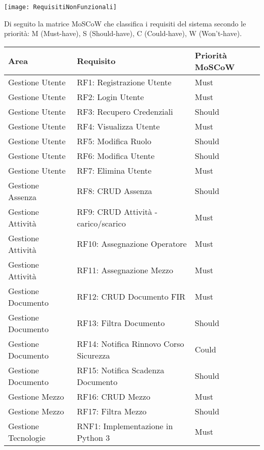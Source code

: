 \documentclass[a4paper]{report}
\begin{document}
\begin{figure*}[ht]
    \centering
    \texttt{[image: RequisitiNonFunzionali]}
\end{figure*}


\clearpage
{}

Di seguito la matrice MoSCoW che classifica i requisiti del sistema secondo le priorità: M (Must-have), S (Should-have), C (Could-have), W (Won't-have).

\begin{longtable}{|p{4.5cm}|p{6.25cm}|p{2cm}|}
\hline
	\textbf{Area} & \textbf{Requisito} & \textbf{Priorità MoSCoW} \\
\hline
\endhead

Gestione Utente & RF1: Registrazione Utente & Must \\
\hline
Gestione Utente & RF2: Login Utente & Must \\
\hline
Gestione Utente & RF3: Recupero Credenziali & Should \\
\hline
Gestione Utente & RF4: Visualizza Utente & Must \\
\hline
Gestione Utente & RF5: Modifica Ruolo & Should \\
\hline
Gestione Utente & RF6: Modifica Utente & Should \\
\hline
Gestione Utente & RF7: Elimina Utente & Must \\
\hline
Gestione Assenza & RF8: CRUD Assenza & Should \\
\hline
Gestione Attività & RF9: CRUD Attività - carico/scarico & Must \\
\hline
Gestione Attività & RF10: Assegnazione Operatore & Must \\
\hline
Gestione Attività & RF11: Assegnazione Mezzo & Must \\
\hline
Gestione Documento & RF12: CRUD Documento FIR & Must \\
\hline
Gestione Documento & RF13: Filtra Documento & Should \\
\hline
Gestione Documento & RF14: Notifica Rinnovo Corso Sicurezza & Could \\
\hline
Gestione Documento & RF15: Notifica Scadenza Documento & Should \\
\hline
Gestione Mezzo & RF16: CRUD Mezzo & Must \\
\hline
Gestione Mezzo & RF17: Filtra Mezzo & Should \\
\hline
Gestione Tecnologie & RNF1: Implementazione in Python 3 & Must \\

\end{longtable}
\end{document}
